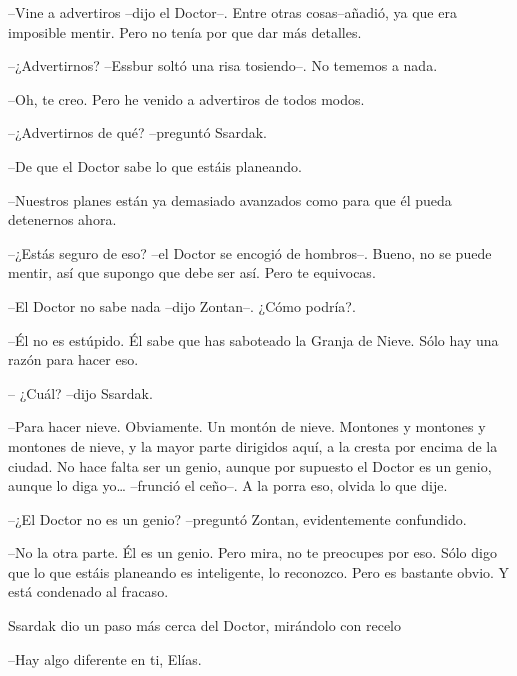 --Vine a advertiros --dijo el Doctor--. Entre otras cosas--añadió, ya que era imposible mentir. Pero no tenía por que dar más detalles.



--¿Advertirnos? --Essbur soltó una risa tosiendo--. No tememos a nada.



--Oh, te creo. Pero he venido a advertiros de todos modos.


--¿Advertirnos de qué? --preguntó Ssardak.



--De que el Doctor sabe lo que estáis planeando.



--Nuestros planes están ya demasiado avanzados como para que él pueda detenernos ahora.



--¿Estás seguro de eso? --el Doctor se encogió de hombros--. Bueno, no se puede mentir, así que supongo que debe ser así. Pero te equivocas. 



--El Doctor no sabe nada --dijo Zontan--. ¿Cómo podría?.



--Él no es estúpido. Él sabe que has saboteado la Granja de Nieve. Sólo hay una razón para hacer eso. 



-- ¿Cuál? --dijo Ssardak.



--Para hacer nieve. Obviamente. Un montón de nieve. Montones y montones y montones de nieve, y la mayor parte dirigidos aquí, a la cresta por encima de la ciudad. No hace falta ser un genio, aunque por supuesto el Doctor es un genio, aunque lo diga yo… --frunció el ceño--. A la porra eso, olvida lo que dije.



--¿El Doctor no es un genio? --preguntó Zontan, evidentemente confundido.



--No la otra parte. Él es un genio. Pero mira, no te preocupes por eso. Sólo digo que lo que estáis planeando es inteligente, lo reconozco. Pero es bastante obvio. Y está condenado al fracaso.



Ssardak dio un paso más cerca del Doctor, mirándolo con recelo


--Hay algo diferente en ti, Elías.



